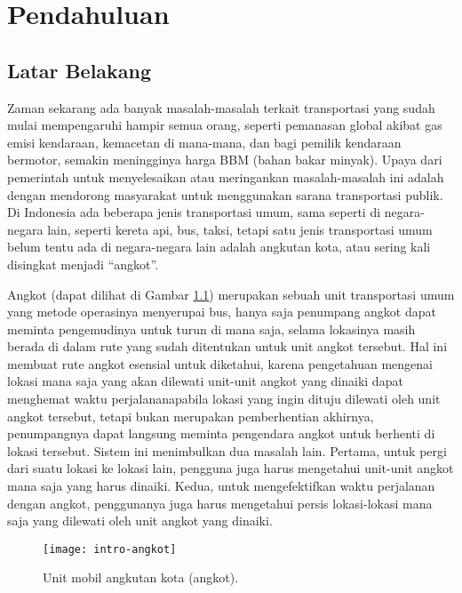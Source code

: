 \chapter{Pendahuluan}
\label{chap:intro}
   
\section{Latar Belakang}
\label{sec:label}
Zaman sekarang ada banyak masalah-masalah terkait transportasi yang sudah mulai mempengaruhi hampir semua orang, seperti pemanasan global akibat gas emisi kendaraan, kemacetan di mana-mana, dan bagi pemilik kendaraan bermotor, semakin meningginya harga BBM (bahan bakar minyak). Upaya dari pemerintah untuk menyelesaikan atau meringankan masalah-masalah ini adalah dengan mendorong masyarakat untuk menggunakan sarana transportasi publik. Di Indonesia ada beberapa jenis transportasi umum, sama seperti di negara-negara lain, seperti kereta api, bus, taksi, tetapi satu jenis transportasi umum belum tentu ada di negara-negara lain adalah angkutan kota, atau sering kali disingkat menjadi ``angkot''.

Angkot (dapat dilihat di Gambar \ref{fig:intro-angkot}) merupakan sebuah unit transportasi umum yang metode operasinya menyerupai bus, hanya saja penumpang angkot dapat meminta pengemudinya untuk turun di mana saja, selama lokasinya masih berada di dalam rute yang sudah ditentukan untuk unit angkot tersebut. Hal ini membuat rute angkot esensial untuk diketahui, karena pengetahuan mengenai lokasi mana saja yang akan dilewati unit-unit angkot yang dinaiki dapat menghemat waktu perjalanan\textemdash apabila lokasi yang ingin dituju dilewati oleh unit angkot tersebut, tetapi bukan merupakan pemberhentian akhirnya, penumpangnya dapat langsung meminta pengendara angkot untuk berhenti di lokasi tersebut. Sistem ini menimbulkan dua masalah lain. Pertama, untuk pergi dari suatu lokasi ke lokasi lain, pengguna juga harus mengetahui unit-unit angkot mana saja yang harus dinaiki. Kedua, untuk mengefektifkan waktu perjalanan dengan angkot, penggunanya juga harus mengetahui persis lokasi-lokasi mana saja yang dilewati oleh unit angkot yang dinaiki. 

\begin{figure}[h]
    \centering
    \texttt{[image: intro-angkot]}
    \caption[Unit angkot]{Unit mobil angkutan kota (angkot).}
    \label{fig:intro-angkot}
\end{figure}


